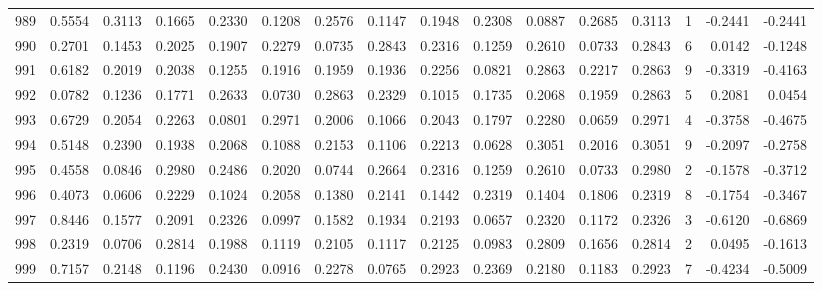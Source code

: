 \begin{tabular}{lrrrrrrrrrrrrrrr}
989 &      0.5554 &  0.3113 &  0.1665 &  0.2330 &  0.1208 &  0.2576 &  0.1147 &  0.1948 &  0.2308 &  0.0887 &   0.2685 &     0.3113 &      1 &                   -0.2441 &                    -0.2441 \\
990 &      0.2701 &  0.1453 &  0.2025 &  0.1907 &  0.2279 &  0.0735 &  0.2843 &  0.2316 &  0.1259 &  0.2610 &   0.0733 &     0.2843 &      6 &                    0.0142 &                    -0.1248 \\
991 &      0.6182 &  0.2019 &  0.2038 &  0.1255 &  0.1916 &  0.1959 &  0.1936 &  0.2256 &  0.0821 &  0.2863 &   0.2217 &     0.2863 &      9 &                   -0.3319 &                    -0.4163 \\
992 &      0.0782 &  0.1236 &  0.1771 &  0.2633 &  0.0730 &  0.2863 &  0.2329 &  0.1015 &  0.1735 &  0.2068 &   0.1959 &     0.2863 &      5 &                    0.2081 &                     0.0454 \\
993 &      0.6729 &  0.2054 &  0.2263 &  0.0801 &  0.2971 &  0.2006 &  0.1066 &  0.2043 &  0.1797 &  0.2280 &   0.0659 &     0.2971 &      4 &                   -0.3758 &                    -0.4675 \\
994 &      0.5148 &  0.2390 &  0.1938 &  0.2068 &  0.1088 &  0.2153 &  0.1106 &  0.2213 &  0.0628 &  0.3051 &   0.2016 &     0.3051 &      9 &                   -0.2097 &                    -0.2758 \\
995 &      0.4558 &  0.0846 &  0.2980 &  0.2486 &  0.2020 &  0.0744 &  0.2664 &  0.2316 &  0.1259 &  0.2610 &   0.0733 &     0.2980 &      2 &                   -0.1578 &                    -0.3712 \\
996 &      0.4073 &  0.0606 &  0.2229 &  0.1024 &  0.2058 &  0.1380 &  0.2141 &  0.1442 &  0.2319 &  0.1404 &   0.1806 &     0.2319 &      8 &                   -0.1754 &                    -0.3467 \\
997 &      0.8446 &  0.1577 &  0.2091 &  0.2326 &  0.0997 &  0.1582 &  0.1934 &  0.2193 &  0.0657 &  0.2320 &   0.1172 &     0.2326 &      3 &                   -0.6120 &                    -0.6869 \\
998 &      0.2319 &  0.0706 &  0.2814 &  0.1988 &  0.1119 &  0.2105 &  0.1117 &  0.2125 &  0.0983 &  0.2809 &   0.1656 &     0.2814 &      2 &                    0.0495 &                    -0.1613 \\
999 &      0.7157 &  0.2148 &  0.1196 &  0.2430 &  0.0916 &  0.2278 &  0.0765 &  0.2923 &  0.2369 &  0.2180 &   0.1183 &     0.2923 &      7 &                   -0.4234 &                    -0.5009 \\
\bottomrule
\end{tabular}
